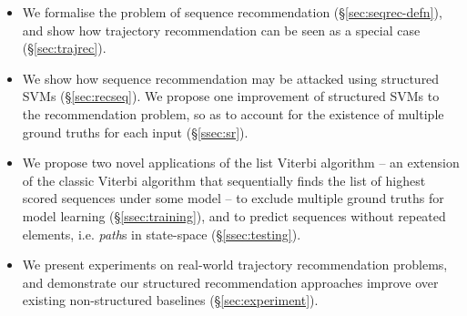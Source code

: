 \begin{itemize}[noitemsep,leftmargin=12pt]\itemmoveup
	\item We formalise the problem of sequence recommendation (\S\ref{sec:seqrec-defn}), and show how trajectory recommendation can be seen as a special case (\S\ref{sec:trajrec}).

	\item We show how sequence recommendation may be attacked using structured SVMs (\S\ref{sec:recseq}).
	We propose one improvement of structured SVMs to the recommendation problem, so as to account for the existence of multiple ground truths for each input (\S\ref{ssec:sr}).

    \item We propose two novel applications of the list Viterbi algorithm -- an extension of the classic Viterbi algorithm that sequentially finds the list of highest scored sequences under some model --
to exclude multiple ground truths for model learning (\S\ref{ssec:training}),
and to predict sequences without repeated elements, i.e. {\em path}s in state-space (\S\ref{ssec:testing}).

	\item We present experiments on real-world trajectory recommendation problems, and demonstrate our structured recommendation approaches improve over existing non-structured baselines (\S\ref{sec:experiment}).\itemmoveup
\end{itemize}

